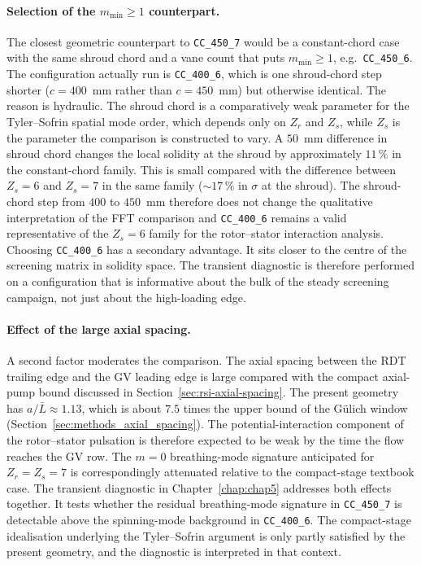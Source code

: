 \paragraph{Selection of the $m_{\min}\geq 1$ counterpart.}
The closest geometric counterpart to \texttt{CC\_450\_7} would be a constant-chord case with the same shroud chord and a vane count that puts $m_{\min}\geq 1$, e.g.\ \texttt{CC\_450\_6}. The configuration actually run is \texttt{CC\_400\_6}, which is one shroud-chord step shorter ($c=400$~mm rather than $c=450$~mm) but otherwise identical. The reason is hydraulic. The shroud chord is a comparatively weak parameter for the Tyler--Sofrin spatial mode order, which depends only on $Z_r$ and $Z_s$, while $Z_s$ is the parameter the comparison is constructed to vary. A $50$~mm difference in shroud chord changes the local solidity at the shroud by approximately $11\,\%$ in the constant-chord family. This is small compared with the difference between $Z_s=6$ and $Z_s=7$ in the same family ($\sim 17\,\%$ in $\sigma$ at the shroud). The shroud-chord step from $400$ to $450$~mm therefore does not change the qualitative interpretation of the FFT comparison and \texttt{CC\_400\_6} remains a valid representative of the $Z_s=6$ family for the rotor--stator interaction analysis. Choosing \texttt{CC\_400\_6} has a secondary advantage. It sits closer to the centre of the screening matrix in solidity space. The transient diagnostic is therefore performed on a configuration that is informative about the bulk of the steady screening campaign, not just about the high-loading edge.

\paragraph{Effect of the large axial spacing.}
A second factor moderates the comparison. The axial spacing between the RDT trailing edge and the GV leading edge is large compared with the compact axial-pump bound discussed in Section~\ref{sec:rsi-axial-spacing}. The present geometry has $a/\bar{L} \approx 1.13$, which is about $7.5$ times the upper bound of the G\"ulich window (Section~\ref{sec:methods_axial_spacing}). The potential-interaction component of the rotor--stator pulsation is therefore expected to be weak by the time the flow reaches the GV row. The $m=0$ breathing-mode signature anticipated for $Z_r = Z_s = 7$ is correspondingly attenuated relative to the compact-stage textbook case. The transient diagnostic in Chapter~\ref{chap:chap5} addresses both effects together. It tests whether the residual breathing-mode signature in \texttt{CC\_450\_7} is detectable above the spinning-mode background in \texttt{CC\_400\_6}. The compact-stage idealisation underlying the Tyler--Sofrin argument is only partly satisfied by the present geometry, and the diagnostic is interpreted in that context.

